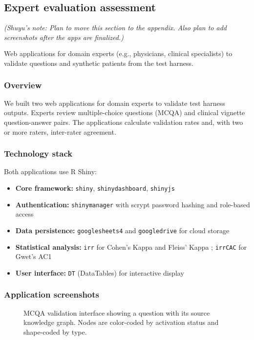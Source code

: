 
\subsection{Expert evaluation assessment}
\textit{(Shuyu's note: Plan to move this section to the appendix. Also plan to add screenshots after the apps are finalized.)}

Web applications for domain experts (e.g., physicians, clinical specialists) to validate questions and synthetic patients from the test harness.

\subsubsection{Overview}
We built two web applications for domain experts to validate test harness outputs. Experts review multiple-choice questions (MCQA) and clinical vignette question-answer pairs. The applications calculate validation rates and, with two or more raters, inter-rater agreement.

\subsubsection{Technology stack}
Both applications use R Shiny:

\begin{itemize}
    \item \textbf{Core framework:} \texttt{shiny}, \texttt{shinydashboard}, \texttt{shinyjs}
    \item \textbf{Authentication:} \texttt{shinymanager} with scrypt password hashing and role-based access
    \item \textbf{Data persistence:} \texttt{googlesheets4} and \texttt{googledrive} for cloud storage
    \item \textbf{Statistical analysis:} \texttt{irr} for Cohen's Kappa \cite{cohen1960} and Fleiss' Kappa \cite{fleiss1971}; \texttt{irrCAC} for Gwet's AC1 \cite{gwet2008}
    \item \textbf{User interface:} \texttt{DT} (DataTables) for interactive display
\end{itemize}

\subsubsection{Application screenshots}

\begin{figure}[h]
\centering
\caption{MCQA validation interface showing a question with its source knowledge graph. Nodes are color-coded by activation status and shape-coded by type.}
\label{fig:mcqa-screenshot}
\end{figure}

